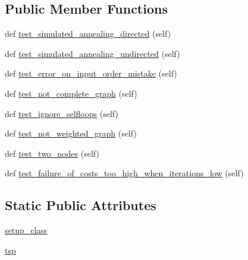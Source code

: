 \subsection*{Public Member Functions}
\begin{DoxyCompactItemize}
\item 
def \hyperlink{classnetworkx_1_1algorithms_1_1approximation_1_1tests_1_1test__traveling__salesman_1_1TestSimulatedAnnealingTSP_adfdfaede04473e8900d72bb36d8db61d}{test\+\_\+simulated\+\_\+annealing\+\_\+directed} (self)
\item 
def \hyperlink{classnetworkx_1_1algorithms_1_1approximation_1_1tests_1_1test__traveling__salesman_1_1TestSimulatedAnnealingTSP_a5f67a81ad540836c019070a5f0b28f27}{test\+\_\+simulated\+\_\+annealing\+\_\+undirected} (self)
\item 
def \hyperlink{classnetworkx_1_1algorithms_1_1approximation_1_1tests_1_1test__traveling__salesman_1_1TestSimulatedAnnealingTSP_a0cbcb374c253481f10c9610549512ed0}{test\+\_\+error\+\_\+on\+\_\+input\+\_\+order\+\_\+mistake} (self)
\item 
def \hyperlink{classnetworkx_1_1algorithms_1_1approximation_1_1tests_1_1test__traveling__salesman_1_1TestSimulatedAnnealingTSP_aa124c2bfc06acb72a4a7aed5023b876a}{test\+\_\+not\+\_\+complete\+\_\+graph} (self)
\item 
def \hyperlink{classnetworkx_1_1algorithms_1_1approximation_1_1tests_1_1test__traveling__salesman_1_1TestSimulatedAnnealingTSP_a4eb8dccd08a7d5c00e2536ddcf55d2a8}{test\+\_\+ignore\+\_\+selfloops} (self)
\item 
def \hyperlink{classnetworkx_1_1algorithms_1_1approximation_1_1tests_1_1test__traveling__salesman_1_1TestSimulatedAnnealingTSP_afdc9a06eb58f868a58d12b2d15e08c3b}{test\+\_\+not\+\_\+weighted\+\_\+graph} (self)
\item 
def \hyperlink{classnetworkx_1_1algorithms_1_1approximation_1_1tests_1_1test__traveling__salesman_1_1TestSimulatedAnnealingTSP_a7530d3a98463d7dc2cbb1ae5930cfc6c}{test\+\_\+two\+\_\+nodes} (self)
\item 
def \hyperlink{classnetworkx_1_1algorithms_1_1approximation_1_1tests_1_1test__traveling__salesman_1_1TestSimulatedAnnealingTSP_a738d2a216ca9c0021b7351f3ef9d06b5}{test\+\_\+failure\+\_\+of\+\_\+costs\+\_\+too\+\_\+high\+\_\+when\+\_\+iterations\+\_\+low} (self)
\end{DoxyCompactItemize}
\subsection*{Static Public Attributes}
\begin{DoxyCompactItemize}
\item 
\hyperlink{classnetworkx_1_1algorithms_1_1approximation_1_1tests_1_1test__traveling__salesman_1_1TestSimulatedAnnealingTSP_a5f2532d3cabd1463a1d572930297b3a9}{setup\+\_\+class}
\item 
\hyperlink{classnetworkx_1_1algorithms_1_1approximation_1_1tests_1_1test__traveling__salesman_1_1TestSimulatedAnnealingTSP_a7c0dfa67ce3fe7a17f877e87c6424ecf}{tsp}
\end{DoxyCompactItemize}


